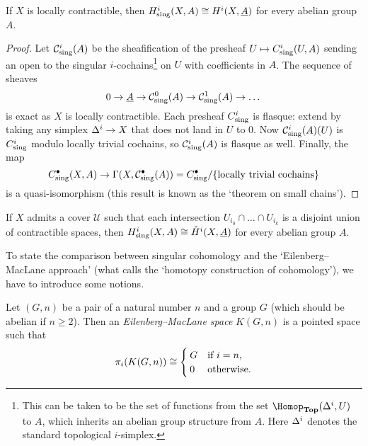 \begin{prop}\label{prop:comparison-singular-cohomology-sheaf-cohomology}
If \(X\) is locally contractible, then \(H^i_{\smash{\textup{sing}}}(X,A) \cong H^i(X,\underline{A})\) for every abelian group \(A\).
\end{prop}
\begin{proof}
Let \(\mathcal C^i_{\smash{\textup{sing}}}(A)\) be the sheafification of the presheaf \(U\mapsto C^i_{\smash{\textup{sing}}}(U,A)\) sending an open to the singular \(i\)-cochains\footnote{This can be taken to be the set of functions from the set \(\Hom[\catTopologicalSpace](\simplex[i],U)\) to \(A\), which inherits an abelian group structure from \(A\). Here \(\simplex[i]\) denotes the standard topological \(i\)-simplex.} on \(U\) with coefficients in \(A\).
The sequence of sheaves
\[ 0 \to \underline{A} \to \mathcal C^0_{\smash{\textup{sing}}}(A) \to \mathcal C^1_{\smash{\textup{sing}}}(A)\to\dots \]
is exact as \(X\) is locally contractible.
Each presheaf \(C^i_{\smash{\textup{sing}}}\) is flasque: extend by taking any simplex \(\simplex[i]\to X\) that does not land in \(U\) to \(0\).
Now \(\mathcal C^i_{\smash{\textup{sing}}}(A)(U)\) is \(C^i_{\smash{\textup{sing}}}\) modulo locally trivial cochains, so \(\mathcal C^i_{\smash{\textup{sing}}}(A)\) is flasque as well.
Finally, the map
\[ C^\bullet_{\smash{\textup{sing}}}(X,A) \to \Gamma(X,\mathcal C^\bullet_{\smash{\textup{sing}}}(A)) = C^\bullet_{\smash{\textup{sing}}}/\{\text{locally trivial cochains}\} \]
is a quasi-isomorphism (this result is known as the `theorem on small chains').
\end{proof}

\begin{prop}\label{prop:comparison-singular-cohomology-Čech-cohomology}
If \(X\) admits a cover \(\mathcal U\) such that each intersection \(U_{i_0}\cap\dots\cap U_{i_k}\) is a disjoint union of contractible spaces, then \(H^i_{\smash{\textup{sing}}}(X,A)\cong\check{H}^i(X,\underline{A})\) for every abelian group \(A\).
\end{prop}

To state the comparison between singular cohomology and the `Eilenberg--MacLane approach' (what \cite{hatcherAlgebraicTopology2002} calls the `homotopy construction of cohomology'), we have to introduce some notions.

\begin{defn}\label{defn:Eilenberg-MacLane-space}
Let \((G,n)\) be a pair of a natural number \(n\) and a group \(G\) (which should be abelian if \(n\geq 2\)).
Then an \emph{Eilenberg--MacLane space} \(K(G,n)\) is a pointed space such that
\[ \homotopy[i](K(G,n)) \cong
  \begin{cases}
    G & \text{if } i = n\text{,} \\
    0 & \text{otherwise.}
  \end{cases}
\]
\end{defn}


